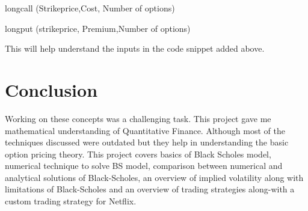 \documentclass[12pt]{article}
\begin{document}
	longcall (Strikeprice,Cost, Number of options)
	
	longput (strikeprice, Premium,Number of options)
	
	This will help understand the inputs in the code snippet added above.
	
	\section{Conclusion}
	
	Working on these concepts was a challenging task. This project gave me mathematical understanding of Quantitative Finance. Although most of the techniques discussed were outdated but they help in understanding the basic option pricing theory. This project covers basics of Black Scholes model, numerical technique to solve BS model, comparison between numerical and analytical solutions of Black-Scholes, an overview of implied volatility along with limitations of Black-Scholes and an overview of trading strategies along-with a custom trading strategy for Netflix.
	
	
	
		
	




	


	
	
\end{document}
